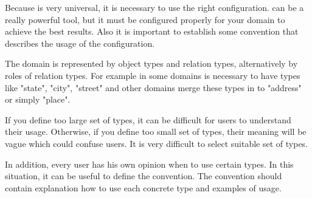 
Because \textan{} is very universal, it is necessary to use the right
configuration. \textan can be a really powerful tool, but it must be
configured properly for your domain to achieve the best results. Also it is
important to establish some convention that describes the usage of the
configuration.

The domain is represented by object types and relation types, alternatively by
roles of relation types. For example in some domains is necessary to have types
like "state", "city", "street" and other domains merge these types in to
"address" or simply "place".

If you define too large set of types, it can be difficult for users to understand
their usage. Otherwise, if you define too small set of types, their meaning will
be vague which could confuse users. It is very difficult to select suitable set
of types.

In addition, every user has his own opinion when to use certain types. In this
situation, it can be useful to define the convention. The convention should
contain explanation how to use each concrete type and examples of usage.
